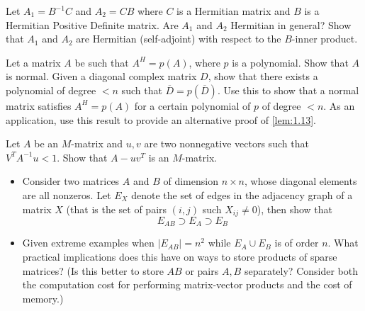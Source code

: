 \documentclass{ctexart}
\newif\ifpreface
\begin{document}
\large
\setlength{\baselineskip}{1.2em}
\ifpreface
    
\newgeometry{left=2cm,right=2cm,top=2cm,bottom=2cm}
\else
{}
\maketitle
\fi
\begin{lemma}\label{lem:1.13}
\end{lemma}

\begin{problem} 
  Let \(A_1=B^{-1}C \) and \(A_2 =CB \) where \(C \) is a Hermitian matrix and 
  \(B \) is a Hermitian Positive Definite matrix. Are \(A_1 \) and \(A_2 \) 
  Hermitian in general? Show that \(A_1 \) and \(A_2 \) are Hermitian (self-adjoint)
  with respect to the \(B \)-inner product.
\end{problem}
\begin{problem} 
  Let a matrix \(A \) be such that \(A^H =p(A) \), where \(p \) is a polynomial. 
  Show that \(A \) is normal. Given a diagonal complex matrix \(D \), show 
  that there exists a polynomial of degree \(< n \) such that \(\overline{D} =p(\overline{D} ) \). 
  Use this to show that a normal matrix satisfies \(A^H=p(A) \) for a certain 
  polynomial of \(p \) of degree \(<n \). As an application, use this result to 
  provide an alternative proof of \ref{lem:1.13}. 
\end{problem}
\begin{problem}  
  Let \(A \) be an \(M \)-matrix and \(u,v \) are two nonnegative vectors such 
  that \(V^T A^{-1} u <1 \). Show that \(A-uv^T \) is an \(M \)-matrix.
\end{problem}
\begin{problem} 
  \begin{itemize}
    \item   Consider two matrices \(A \) and \(B \) of dimension \(n \times n \), whose diagonal 
      elements are all nonzeros. Let \(E_X \) denote the set of edges in the 
      adjacency graph of a matrix \(X \) (that is the set of pairs \((i,j) \) 
      such \(  X_{ij} \neq 0\)), then show that \[
        E_{AB} \supset E_A \supset E_B
      \]
    \item Given extreme examples when \(|E_{AB}| =n^2 \) while \(E_A \cup E_B \) is of 
      order \(n \). What practical implications does this have on ways to store 
      products of sparse matrices? (Is this better to store \(AB \) or pairs \(A,B \) 
      separately? Consider both the computation cost for performing matrix-vector 
      products and the cost of memory.)
  \end{itemize}
\end{problem}
\end{document}

